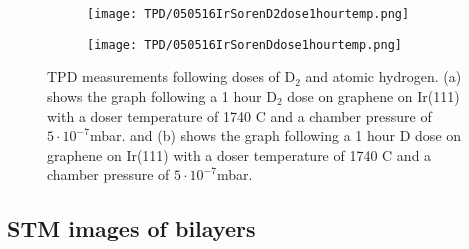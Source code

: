 \begin{figure}
  \centering
  \begin{subfigure}[b]{0.45\textwidth}
    \texttt{[image: TPD/050516IrSorenD2dose1hourtemp.png]}
    \caption{}
    \label{TPD:D22}
  \end{subfigure}\hspace{0.5cm}
  \begin{subfigure}[b]{0.45\textwidth}
    \texttt{[image: TPD/050516IrSorenDdose1hourtemp.png]}
    \caption{}
    \label{TPD:D2}
  \end{subfigure}
  \caption{TPD measurements following doses of D$_2$ and atomic hydrogen. (a) shows the graph following a 1 hour D$_2$ dose on graphene on Ir(111) with a doser temperature of 1740 \degree C and a chamber pressure of $5\cdot 10^{-7}$mbar. and (b) shows the graph following a 1 hour D dose on graphene on Ir(111) with a doser temperature of 1740 \degree C and a chamber pressure of $5\cdot 10^{-7}$mbar.}
  \label{TPD:all}
\end{figure}


\subsection{STM images of bilayers}

